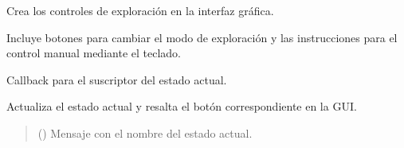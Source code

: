 \documentclass[a4paper,10pt,spanish]{sphinxmanual}
\begin{document}
\begin{fulllineitems}
\begin{fulllineitems}
\begin{quote}
\begin{description}
\end{description}\end{quote}

\end{fulllineitems}


\begin{fulllineitems}
\label{\detokenize{squad_state_manager:squad_interfaz.InterfazManager.create_exploration_controls}}
\pysigstartsignatures
{}
\pysigstopsignatures
\sphinxAtStartPar
Crea los controles de exploración en la interfaz gráfica.

\sphinxAtStartPar
Incluye botones para cambiar el modo de exploración y las instrucciones para el
control manual mediante el teclado.

\end{fulllineitems}


\begin{fulllineitems}
\label{\detokenize{squad_state_manager:squad_interfaz.InterfazManager.current_state_callback}}
\pysigstartsignatures
{}
\pysigstopsignatures
\sphinxAtStartPar
Callback para el suscriptor del estado actual.

\sphinxAtStartPar
Actualiza el estado actual y resalta el botón correspondiente en la GUI.
\begin{quote}\begin{description}
\sphinxAtStartPar
{} () \textendash{} Mensaje con el nombre del estado actual.

\end{description}\end{quote}

\end{fulllineitems}



\end{fulllineitems}
\end{document}
